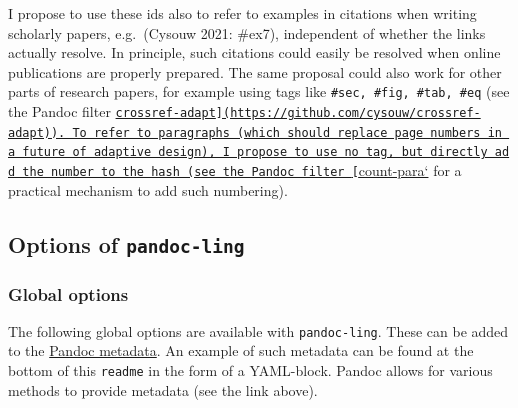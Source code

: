 \documentclass[
]{article}
\begin{document}
I propose to use these ids also to refer to examples in citations when
writing scholarly papers, e.g.~(Cysouw 2021: \#ex7), independent of
whether the links actually resolve. In principle, such citations could
easily be resolved when online publications are properly prepared. The
same proposal could also work for other parts of research papers, for
example using tags like \texttt{\#sec,\ \#fig,\ \#tab,\ \#eq} (see the
Pandoc filter
\href{https://github.com/cysouw/count-para}{\texttt{crossref-adapt{]}(https://github.com/cysouw/crossref-adapt)).\ To\ refer\ to\ paragraphs\ (which\ should\ replace\ page\ numbers\ in\ a\ future\ of\ adaptive\ design),\ I\ propose\ to\ use\ no\ tag,\ but\ directly\ add\ the\ number\ to\ the\ hash\ (see\ the\ Pandoc\ filter\ {[}}count-para`}
for a practical mechanism to add such numbering).

\hypertarget{options-of-pandoc-ling}{%
\subsection{\texorpdfstring{Options of
\texttt{pandoc-ling}}{Options of pandoc-ling}}\label{options-of-pandoc-ling}}

\hypertarget{global-options}{%
\subsubsection{Global options}\label{global-options}}

The following global options are available with \texttt{pandoc-ling}.
These can be added to the
\href{https://pandoc.org/MANUAL.html\#metadata-blocks}{Pandoc metadata}.
An example of such metadata can be found at the bottom of this
\texttt{readme} in the form of a YAML-block. Pandoc allows for various
methods to provide metadata (see the link above).
\end{document}
